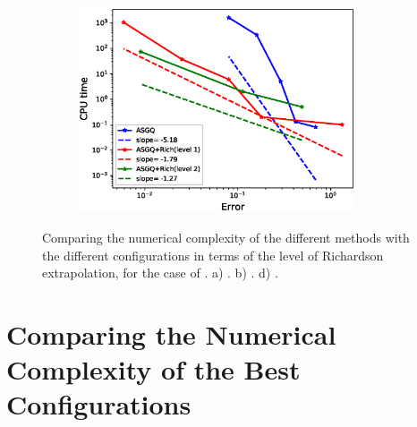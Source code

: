 \documentclass[ima, 20pt, portrait, plainboxedsections]{sciposter}
\begin{document}
\begin{multicols}{3}
\begin{figure}
\begin{subfigure}{0.495\textwidth}
		\caption{}
	\end{subfigure}
	\begin{subfigure}{0.5\textwidth}
		\centering
		\includegraphics[width=0.9\textwidth]{./rBergomi_Complexity_rates/set2/error_vs_time_set2_MISC_comparison}
		\caption{}
	\end{subfigure}%
	\caption{Comparing the numerical complexity of the different  methods with the different configurations in terms of the level of Richardson extrapolation,  for the case of . a) . b) . d) . }
	\label{fig: Comparing the numerical complexity of the different  methods with the different configurations}
\end{figure}
\section*{Comparing the Numerical Complexity of the Best Configurations}


\end{multicols}
\end{document}
